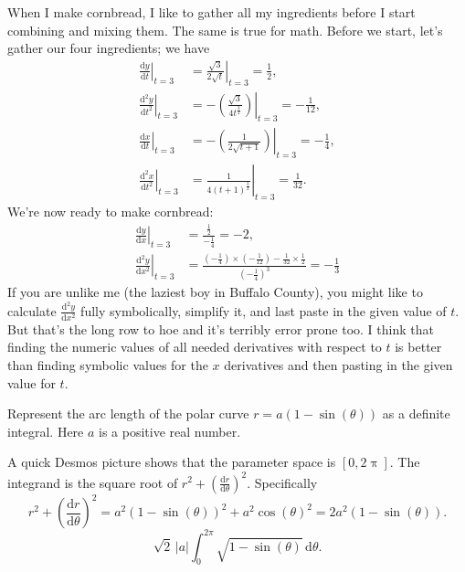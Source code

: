 \documentclass[12pt,fleqn,answers]{exam}
\begin{document}
\begin{questions}
\begin{solution}[3.5in]
When I make cornbread, I like to gather all my ingredients before I start combining and mixing them.  The same is
true for math.  Before we start, let's gather our four ingredients; we have
\begin{align*}
\left. \frac{\mathrm{d} y}{\mathrm{d} t} \right \vert_{t=3}
&= \left. \frac{\sqrt{3}}{2 \sqrt{t}}  \right \vert_{t=3} = \frac{1}{2}, \\
\left. \frac{\mathrm{d}^2 y}{\mathrm{d} t^2} \right \vert_{t=3}
& = \left . - \left( \frac{\sqrt{3}}{4 {{t}^{\frac{3}{2}}}}\right) \right \vert_{t=3} = - \frac{1}{12}, \\
\left. \frac{\mathrm{d} x}{\mathrm{d} t} \right \vert_{t=3}
&=  \left. - \left( \frac{1}{2 \sqrt{t + 1}}\right) \right \vert_{t=3} = -\frac{1}{4}, \\
\left. \frac{\mathrm{d}^2 x}{\mathrm{d} t^2} \right \vert_{t=3} 
&= \left. \frac{1}{4 {{\left( t +1\right) }^{\frac{3}{2}}}} \right \vert_{t=3} = \frac{1}{32}.
\end{align*}
We're now ready to make cornbread:
\begin{align*}
\left. \frac{\mathrm{d} y}{\mathrm{d} x} \right \vert_{t=3} &= \frac{\frac{1}{2}}{-\frac{1}{4}} = -2,\\
\left. \frac{\mathrm{d}^2 y}{\mathrm{d} x^2} \right \vert_{t=3} &= 
\frac{\left(-\frac{1}{4} \right) \times \left(-\frac{1}{12} \right) - \frac{1}{32} \times \frac{1}{2}}
{\left(- \frac{1}{4}\right)^3} = -\frac{1}{3}
\end{align*}
If you are unlike me (the laziest boy in Buffalo County), you might like to calculate $ \frac{\mathrm{d}^2 y}{\mathrm{d} x^2}$
fully symbolically, simplify it, and last paste in the given value of $t$.  But that's the long row to hoe and it's terribly
error prone too. I think that finding the numeric values of all needed derivatives with respect to $t$ is better than
finding symbolic values for the $x$ derivatives and then pasting in the given value for $t$.


\end{solution}

\question Represent the arc length of the polar curve $r = a (1-\sin(\theta))$
as a definite integral. Here $a$ is a positive real number.

\begin{solution}[3.5in]
A quick Desmos picture shows that the parameter space is $[0,2\uppi]$.
The integrand is the square root of $r^2 + \left(\frac{\mathrm{d} r}{\mathrm{d} \theta}\right)^2$. 
Specifically
\begin{equation}
r^2 + \left(\frac{\mathrm{d} r}{\mathrm{d} \theta}\right)^2
= a^2 (1-\sin(\theta))^2 + a^2 \cos(\theta)^2
= 2 a^2 (1- \sin(\theta)).
\end{equation}
  \begin{equation}
  \sqrt{2}\, \left| a\right|  \int_0^{2 \pi}   \sqrt{1-\sin{(\theta)}}
  \, \mathrm{d} \theta.
  \end{equation}
\end{solution}


\end{questions}
\end{document}
